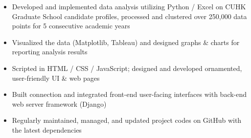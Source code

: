 \documentclass[classic]{resume}
\begin{document}
    \begin{itemize}
        \item Developed and implemented data analysis utilizing  Python / Excel on CUHK Graduate School candidate profiles, processed and clustered over 250,000 data points for 5 consecutive academic years
        \item Visualized the data (Matplotlib, Tableau) and designed graphs \& charts for reporting analysis results
    \end{itemize}

    \begin{itemize}
        \item Scripted in HTML / CSS / JavaScript; designed and developed ornamented, user-friendly UI \& web pages
        \item Built connection and integrated front-end user-facing interfaces with back-end web server framework (Django)
        \item Regularly maintained, managed, and updated project codes on GitHub with the latest dependencies
    \end{itemize}

\end{document}

